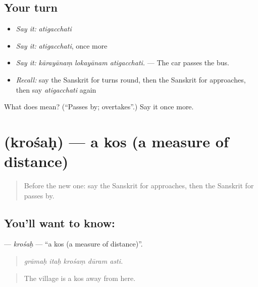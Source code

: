 \subsection*{Your turn}
\begin{itemize}
\raggedright
  \item \emph{Say it:} \emph{atigacchati}
  \item \emph{Say it:} \emph{atigacchati}, once more
  \item \emph{Say it:} \emph{kārayānaṃ lokayānam atigacchati.} — The car passes the bus.
  \item \emph{Recall:} say the Sanskrit for turns round, then the Sanskrit for approaches, then say \emph{atigacchati} again
\end{itemize}

\begin{tcolorbox}[breakable,colback=teal!4,colframe=teal!35!black,title={Before you move on}]
What does  mean? (\textquotedblleft{}Passes by; overtakes\textquotedblright{}.) Say it once more.
\end{tcolorbox}
\section[\texorpdfstring{\sk{क्रोशः} (krośaḥ)}{क्रोशः (krośaḥ)}]{ (krośaḥ) — a kos (a measure of distance)}

\label{lesson:SA-C412-krosah}



\begin{quote}
Before the new one: say the Sanskrit for approaches, then the Sanskrit for passes by.
\end{quote}

\subsection*{You'll want to know: }
\textbf{} — \emph{krośaḥ} — \textquotedblleft{}a kos (a measure of distance)\textquotedblright{}.

\begin{quote}
    
\end{quote}

\begin{quote}
\emph{grāmaḥ itaḥ krośaṃ dūram asti.}
\end{quote}

\begin{quote}
The village is a kos away from here.
\end{quote}

